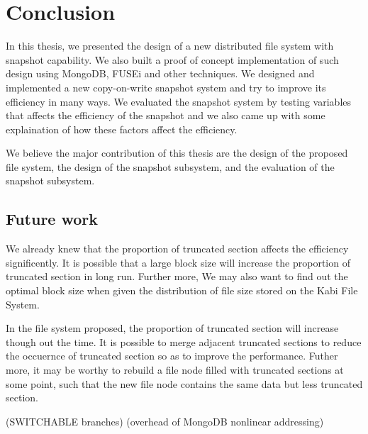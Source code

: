 \chapter{Conclusion}
\label{chap:conclusion}

    In this thesis, we presented the design of a new distributed file system with snapshot capability. We also built a proof of concept implementation of such design using MongoDB, FUSEi and other techniques. We designed and implemented a new copy-on-write snapshot system and try to improve its efficiency in many ways. We evaluated the snapshot system by testing variables that affects the efficiency of the snapshot and we also came up with some explaination of how these factors affect the efficiency.

    We believe the major contribution of this thesis are the design of the proposed file system, the design of the snapshot subsystem, and the evaluation of the snapshot subsystem.

\section{Future work}

     We already knew that the proportion of truncated section affects the efficiency significently. It is possible that a large block size will increase the proportion of truncated section in long run. Further more, We may also want to find out the optimal block size when given the distribution of file size stored on the Kabi File System.

     In the file system proposed, the proportion of truncated section will increase though out the time. It is possible to merge adjacent truncated sections to reduce the occuernce of truncated section so as to improve the performance. Futher more, it may be worthy to rebuild a file node filled with truncated sections at some point, such that the new file node contains the same data but less truncated section.

     (SWITCHABLE branches)
     (overhead of MongoDB nonlinear addressing)
